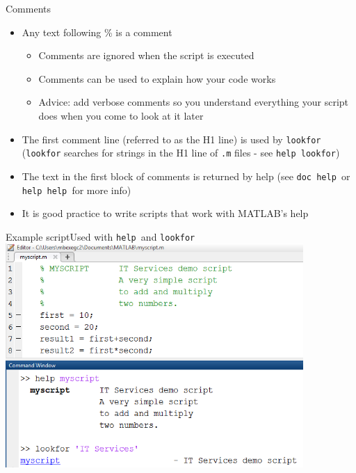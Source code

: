 \documentclass{beamer}
\begin{document}
\begin{frame}{Comments}
	\begin{itemize}
		\item Any text following \% is a comment
		\begin{itemize}
			\item Comments are ignored when the script is executed
			\item Comments can be used to explain how your code works
			\item Advice: add verbose comments so you understand everything your script does when you come to look at it later
		\end{itemize}
		\item The first comment line (referred to as the H1 line) is used by \texttt{lookfor} (\texttt{lookfor} searches for strings in the H1 line of \texttt{.m} files - see \texttt{help lookfor})
		\item The text in the first block of comments is returned by help (see \texttt{doc help }or \texttt{help help }for more info)
		\item It is good practice to write scripts that work with MATLAB’s help
		
		
	\end{itemize}
\end{frame}

\begin{frame}{Example script}{Used with \texttt{help }and \texttt{lookfor}}
	\includegraphics[width=0.85\textwidth]{script_help_lookfor}
\end{frame}
\end{document}
